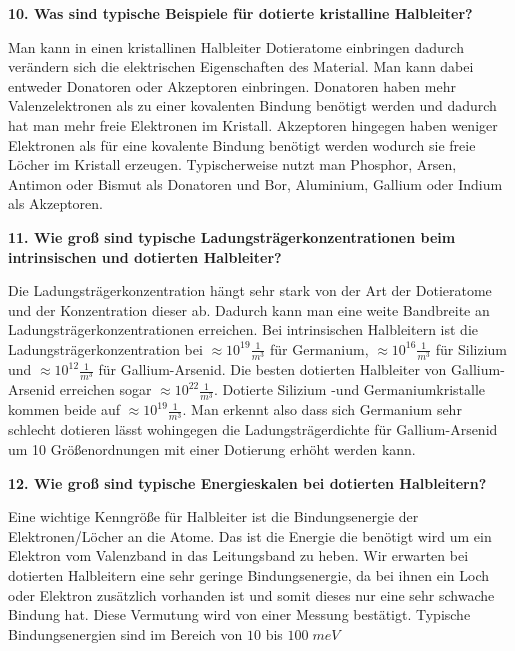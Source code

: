 \noindent\textbf{10. Was sind typische Beispiele für dotierte kristalline Halbleiter?}\\
\begin{addmargin}[25pt]{0pt}
Man kann in einen kristallinen Halbleiter Dotieratome einbringen dadurch verändern sich die elektrischen Eigenschaften des Material. Man kann dabei entweder Donatoren oder Akzeptoren einbringen. Donatoren haben mehr Valenzelektronen als zu einer kovalenten Bindung benötigt werden und dadurch hat man mehr freie Elektronen im Kristall. Akzeptoren hingegen haben weniger Elektronen als für eine kovalente Bindung benötigt werden wodurch sie freie Löcher im Kristall erzeugen. Typischerweise nutzt man Phosphor, Arsen, Antimon oder Bismut als Donatoren und Bor, Aluminium, Gallium oder Indium als Akzeptoren. \\
\end{addmargin}

\noindent\textbf{11. Wie groß sind typische Ladungsträgerkonzentrationen beim intrinsischen und dotierten Halbleiter?}\\
\begin{addmargin}[25pt]{0pt}
Die Ladungsträgerkonzentration hängt sehr stark von der Art der Dotieratome und der Konzentration dieser ab. Dadurch kann man eine weite Bandbreite an Ladungsträgerkonzentrationen erreichen. Bei intrinsischen Halbleitern ist die Ladungsträgerkonzentration bei $\approx 10^{19} \frac{1}{\si{m}^3}$ für Germanium, $\approx 10^{16} \frac{1}{\si{m}^3}$ für Silizium und $\approx 10^{12} \frac{1}{\si{m}^3}$ für Gallium-Arsenid. Die besten dotierten Halbleiter von Gallium-Arsenid erreichen sogar $\approx 10^{22} \frac{1}{\si{m}^3}$. Dotierte Silizium -und Germaniumkristalle kommen beide auf $\approx 10^{19} \frac{1}{\si{m}^3}$. Man erkennt also dass sich Germanium sehr schlecht dotieren lässt wohingegen die Ladungsträgerdichte für Gallium-Arsenid um 10 Größenordnungen mit einer Dotierung erhöht werden kann.\\
\end{addmargin}

\noindent\textbf{12. Wie groß sind typische Energieskalen bei dotierten Halbleitern?}\\
\begin{addmargin}[25pt]{0pt}
Eine wichtige Kenngröße für Halbleiter ist die Bindungsenergie der Elektronen/Löcher an die Atome. Das ist die Energie die benötigt wird um ein Elektron vom Valenzband in das Leitungsband zu heben. Wir erwarten bei dotierten Halbleitern eine sehr geringe Bindungsenergie, da bei ihnen ein Loch oder Elektron zusätzlich vorhanden ist und somit dieses nur eine sehr schwache Bindung hat. Diese Vermutung wird von einer Messung bestätigt. Typische Bindungsenergien sind im Bereich von $10$ bis $100 \;\si{ meV}$ \\
\end{addmargin}


